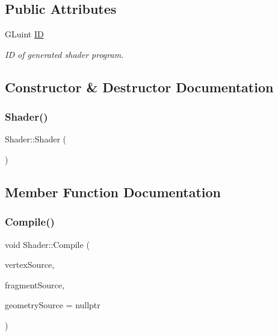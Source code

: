 \subsection*{Public Attributes}
\begin{DoxyCompactItemize}
\item 
G\+Luint \mbox{\hyperlink{class_shader_a7be2afcbd5ba5873a04536a2b4b5e576}{ID}}
\begin{DoxyCompactList}\small\item\em ID of generated shader program. \end{DoxyCompactList}\end{DoxyCompactItemize}


\subsection{Constructor \& Destructor Documentation}
\mbox{\label{class_shader_a0d654ebaca4e0555197c0724c6d30610}} 
\subsubsection{\texorpdfstring{Shader()}{Shader()}}
{\footnotesize\ttfamily Shader\+::\+Shader (\begin{DoxyParamCaption}{ }\end{DoxyParamCaption})\hspace{0.3cm}{\ttfamily [inline]}}



\subsection{Member Function Documentation}
\mbox{\label{class_shader_a4d42d98a025018d7ce564a78ac5b921e}} 
\subsubsection{\texorpdfstring{Compile()}{Compile()}}
{\footnotesize\ttfamily void Shader\+::\+Compile (\begin{DoxyParamCaption}\item[{const G\+Lchar $\ast$}]{vertex\+Source,  }\item[{const G\+Lchar $\ast$}]{fragment\+Source,  }\item[{const G\+Lchar $\ast$}]{geometry\+Source = {\ttfamily nullptr} }\end{DoxyParamCaption})}



